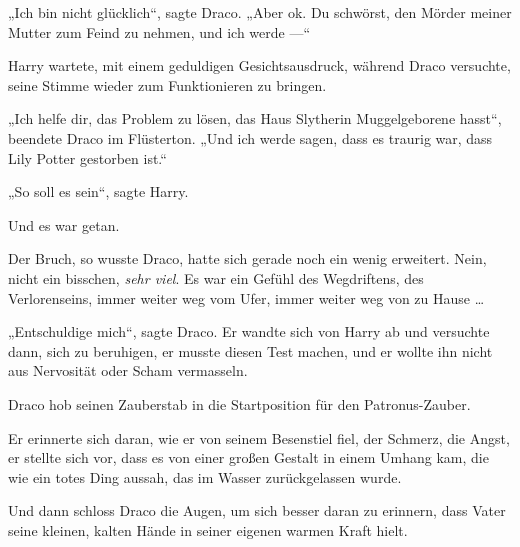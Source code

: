 „Ich bin nicht glücklich“, sagte Draco.
„Aber ok. Du schwörst, den Mörder meiner Mutter zum Feind zu nehmen, und ich werde —“

Harry wartete, mit einem geduldigen Gesichtsausdruck, während Draco versuchte, seine Stimme wieder zum Funktionieren zu bringen.

„Ich helfe dir, das Problem zu lösen, das Haus Slytherin Muggelgeborene hasst“, beendete Draco im Flüsterton.
„Und ich werde sagen, dass es traurig war, dass Lily Potter gestorben ist.“

„So soll es sein“, sagte Harry.

Und es war getan.

Der Bruch, so wusste Draco, hatte sich gerade noch ein wenig erweitert. Nein, nicht ein bisschen, \emph{sehr viel}. Es war ein Gefühl des Wegdriftens, des Verlorenseins, immer weiter weg vom Ufer, immer weiter weg von zu Hause …

„Entschuldige mich“, sagte Draco. Er wandte sich von Harry ab und versuchte dann, sich zu beruhigen, er musste diesen Test machen, und er wollte ihn nicht aus Nervosität oder Scham vermasseln.

Draco hob seinen Zauberstab in die Startposition für den Patronus-Zauber.

Er erinnerte sich daran, wie er von seinem Besenstiel fiel, der Schmerz, die Angst, er stellte sich vor, dass es von einer großen Gestalt in einem Umhang kam, die wie ein totes Ding aussah, das im Wasser zurückgelassen wurde.

Und dann schloss Draco die Augen, um sich besser daran zu erinnern, dass Vater seine kleinen, kalten Hände in seiner eigenen warmen Kraft hielt.

